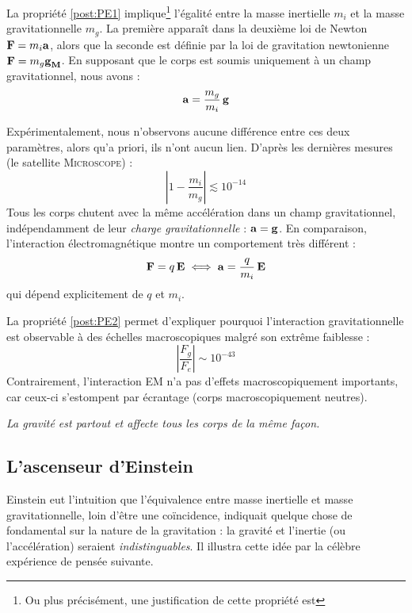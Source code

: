 \begin{rmk}
    La propriété \ref{post:PE1} implique\footnote{Ou plus précisément, une justification de cette propriété est} l'égalité entre la masse inertielle $m_i$ et la masse gravitationnelle $m_g$. La première apparaît dans la deuxième loi de Newton $\bm{\mathrm{F}} =m_{i}\bm{\mathrm{a}}$, alors que la seconde est définie par la loi de gravitation newtonienne $\bm{\mathrm{F}} =m_{g}\bm{\mathrm{g}}_\mathbf{M}$. En supposant que le corps est soumis uniquement à un champ gravitationnel, nous avons :
    \begin{equation}
        \bm{\mathrm{a}} = \frac{m_g}{m_i} \, \bm{\mathrm{g}}
    \end{equation}

    Expérimentalement, nous n'observons aucune différence entre ces deux paramètres, alors qu'a priori, ils n'ont aucun lien. D'après les dernières mesures (le satellite \textsc{Microscope}) :
    \begin{equation}
        \left| 1 - \frac{m_i}{m_g} \right| \lesssim 10^{-14}
    \end{equation}
    Tous les corps chutent avec la même accélération dans un champ gravitationnel, indépendamment de leur \emph{charge gravitationnelle} : $\bm{\mathrm{a}} = \bm{\mathrm{g}}$. En comparaison, l'interaction électromagnétique montre un comportement très différent :
    \begin{equation}
        \bm{\mathrm{F}} = q \, \bm{\mathrm{ E}} \iff \bm{\mathrm{a}} = \frac{q}{m_i} \, \bm{\mathrm{E}}
    \end{equation}
    qui dépend explicitement de $q$ et $m_i$.
\end{rmk}
\begin{rmk}
    La propriété \ref{post:PE2} permet d'expliquer pourquoi l'interaction gravitationnelle est observable à des échelles macroscopiques malgré son extrême faiblesse :
    \begin{equation}
        \left| \frac{F_g}{F_e}\right| \sim 10^{-43}
        \label{force gravité}
    \end{equation}
    Contrairement, l'interaction EM n'a pas d'effets macroscopiquement importants, car ceux-ci s'estompent par écrantage (corps macroscopiquement neutres).
\end{rmk}
\begin{center}
        \textit{La gravité est partout et affecte tous les corps de la même façon.}
    \end{center}
\subsection{L'ascenseur d'Einstein}
Einstein eut l'intuition que l'équivalence entre masse inertielle et masse gravitationnelle, loin d'être une coïncidence, indiquait quelque chose de fondamental sur la nature de la gravitation : la gravité et l'inertie (ou l'accélération) seraient \emph{indistinguables}. Il illustra cette idée par la célèbre expérience de pensée suivante.

